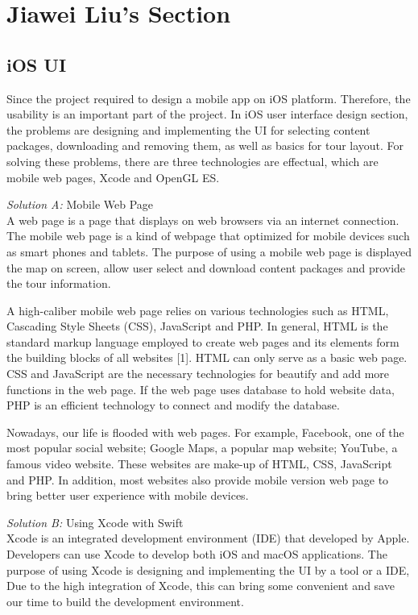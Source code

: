 \documentclass[letterpaper, 10pt,titlepage]{article}
\begin{document}
\vspace{0.3cm}




\section{Jiawei Liu's Section}

\subsection{iOS UI}
Since the project required to design a mobile app on iOS platform. Therefore, the usability is an important part of the project. In iOS user interface design section, the problems are designing and implementing the UI for selecting content packages, downloading and removing them, as well as basics for tour layout. For solving these problems, there are three technologies are effectual, which are mobile web pages, Xcode and OpenGL ES.


\textit{Solution A:} Mobile Web Page\\
A web page is a page that displays on web browsers via an internet connection. The mobile web page is a kind of webpage that optimized for mobile devices such as smart phones and tablets. The purpose of using a mobile web page is displayed the map on screen, allow user select and download content packages and provide the tour information.


A high-caliber mobile web page relies on various technologies such as HTML, Cascading Style Sheets (CSS), JavaScript and PHP. In general, HTML is the standard markup language employed to create web pages and its elements form the building blocks of all websites [1]. HTML can only serve as a basic web page. CSS and JavaScript are the necessary technologies for beautify and add more functions in the web page. If the web page uses database to hold website data, PHP is an efficient technology to connect and modify the database. 


Nowadays, our life is flooded with web pages. For example, Facebook, one of the most popular social website; Google Maps, a popular map website; YouTube, a famous video website. These websites are make-up of HTML, CSS, JavaScript and PHP. In addition, most websites also provide mobile version web page to bring better user experience with mobile devices. 


\textit{Solution B:} Using Xcode with Swift\\
Xcode is an integrated development environment (IDE) that developed by Apple. Developers can use Xcode to develop both iOS and macOS applications. The purpose of using Xcode is designing and implementing the UI by a tool or a IDE, Due to the high integration of Xcode, this can bring some convenient and save our time to build the development environment.  
\end{document}
